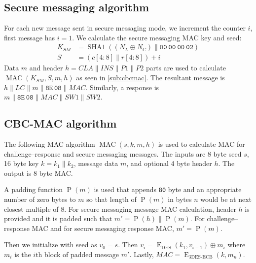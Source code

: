 \documentclass[a4paper]{article}
\newcommand{\conc}{\mathbin{\|}}
\DeclareMathOperator{\MAC}{MAC}
\DeclareMathOperator{\E}{E}
\DeclareMathOperator{\SHAONE}{SHA1}
\DeclareMathOperator{\PP}{P}
\begin{document}
\subsection{Secure messaging algorithm}

For each new message sent in secure messaging mode, we increment the counter $i$, first message has $i=1$.
We calculate the secure messaging MAC key and seed:
\begin{align*}
K_{SM} &= \SHAONE((N_L\oplus N_C)\conc\mathtt{00~00~00~02}) \\
S &= (c[4:8]\conc r[4:8])+i
\end{align*}
Data $m$ and header $h=CLA\conc INS\conc P1\conc P2$ parts are used to calculate $\MAC(K_{SM}, S, m, h)$ as seen in \autoref{sub:cbcmac}. The resultant message is $h\conc LC\conc m\conc\mathtt{8E~08}\conc MAC$. Similarly, a response is $m\conc\mathtt{8E~08}\conc MAC\conc SW1\conc SW2$.
	

\subsection{CBC-MAC algorithm} \label{sub:cbcmac}

The following MAC algorithm $\MAC(s, k, m, h)$ is used to calculate MAC for challenge--response and secure messaging messages. The inputs are 8 byte seed $s$, 16 byte key $k=k_1\conc k_2$, message data $m$, and optional 4 byte header $h$. The output is 8 byte MAC.

A padding function $\PP(m)$ is used that appends \texttt{80} byte and an appropriate number of zero bytes to $m$ so that length of $\PP(m)$ in bytes $n$ would be at next closest multiple of 8. For secure messaging message MAC calculation, header $h$ is provided and it is padded such that $m'=\PP(h)\conc \PP(m)$. For challenge--response MAC and for secure messaging response MAC, $m'=\PP(m)$.

Then we initialize with seed as $v_0=s$. Then $v_i=\E_\textrm{DES}(k_1, v_{i-1})\oplus m_i$ where $m_i$ is the $i$th block of padded message $m'$. Lastly, $MAC=\E_\textrm{3DES-ECB}(k, m_n)$.



\end{document}
